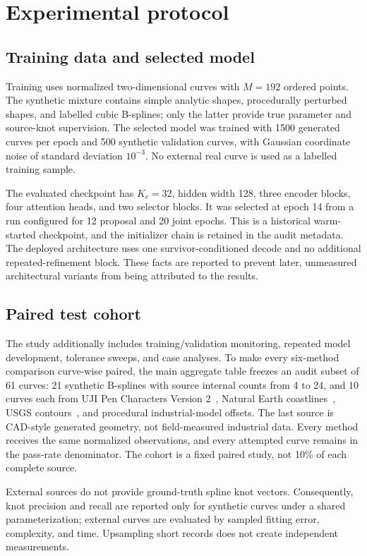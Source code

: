 \documentclass[preprint,12pt]{elsarticle}
\begin{document}
\section{Experimental protocol}
\subsection{Training data and selected model}
Training uses normalized two-dimensional curves with $M=192$ ordered points.
The synthetic mixture contains simple analytic shapes, procedurally perturbed
shapes, and labelled cubic B-splines; only the latter provide true parameter
and source-knot supervision. The selected model was trained with 1500 generated
curves per epoch and 500 synthetic validation curves, with Gaussian coordinate
noise of standard deviation $10^{-3}$. No external real curve is used as a
labelled training sample.

The evaluated checkpoint has $K_c=32$, hidden width 128, three encoder blocks,
four attention heads, and two selector blocks. It was selected at epoch 14
from a run configured for 12 proposal and 20 joint epochs. This is a historical
warm-started checkpoint, and the initializer chain is retained in the audit
metadata. The deployed architecture uses one survivor-conditioned decode and
no additional repeated-refinement block. These facts are reported to prevent
later, unmeasured architectural variants from being attributed to the results.

\subsection{Paired test cohort}
The study additionally includes training/validation monitoring, repeated model
development, tolerance sweeps, and case analyses. To make every six-method
comparison curve-wise paired, the main aggregate table freezes an audit subset
of 61 curves: 21 synthetic B-splines with source
internal counts from 4 to 24, and 10 curves each from UJI Pen Characters
Version 2~\cite{uji2008}, Natural Earth coastlines~\cite{naturalearth}, USGS
contours~\cite{usgscontours}, and procedural industrial-model offsets. The
last source is CAD-style generated geometry, not field-measured industrial
data. Every method receives the same normalized observations, and every
attempted curve remains in the pass-rate denominator. The cohort is a fixed
paired study, not 10\% of each complete source.

External sources do not provide ground-truth spline knot vectors. Consequently,
knot precision and recall are reported only for synthetic curves under a shared
parameterization; external curves are evaluated by sampled fitting error,
complexity, and time. Upsampling short records does not create independent
measurements.
\end{document}
